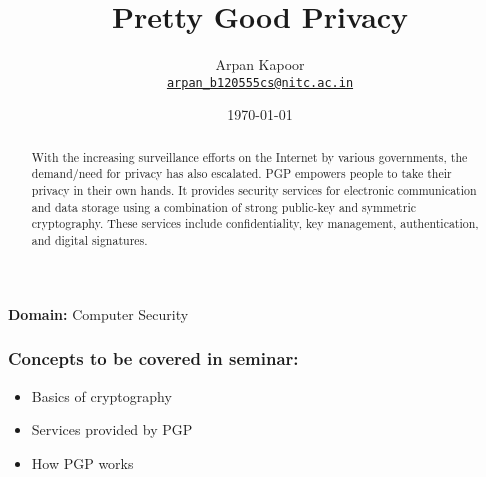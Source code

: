 \documentclass[12pt,a4paper]{article}
\begin{document}
\title{\Huge{Pretty Good Privacy}}
\author{Arpan Kapoor\\
	\href{mailto:arpan_b120555cs@nitc.ac.in}
	{\nolinkurl{arpan_b120555cs@nitc.ac.in}}
}
\date{\today}

\maketitle

\begin{center}
	\textbf{Domain:} Computer Security
\end{center}

\begin{abstract}
With the increasing surveillance efforts on the Internet by various governments,
the demand\slash need for privacy has also escalated. PGP empowers people to
take their privacy in their own hands. It provides security services for
electronic communication and data storage using a combination of strong
public-key and symmetric cryptography. These services include confidentiality,
key management, authentication, and digital signatures.
\end{abstract}

\subsubsection*{Concepts to be covered in seminar:}
\begin{itemize}
	\item Basics of cryptography
	\item Services provided by PGP
	\item How PGP works
\end{itemize}


\nocite{*}
\printbibliography
\end{document}
